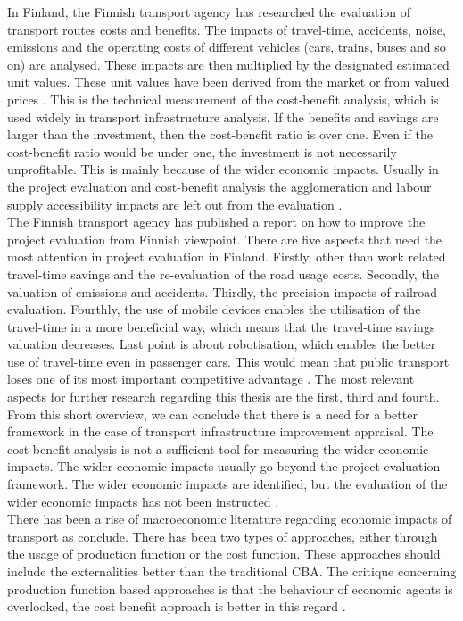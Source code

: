 In Finland, the Finnish transport agency has researched the evaluation of transport routes costs and benefits. The impacts of travel-time, accidents, noise, emissions and the operating costs of different vehicles (cars, trains, buses and so on) are analysed. These impacts are then multiplied by the designated estimated unit values. These unit values have been derived from the market or from valued prices \citep{liikenne}. This is the technical measurement of the cost-benefit analysis, which is used widely in transport infrastructure analysis. If the benefits and savings are larger than the investment, then the cost-benefit ratio is over one. Even if the cost-benefit ratio would be under one, the investment is not necessarily unprofitable. This is mainly because of the wider economic impacts. Usually in the project evaluation and cost-benefit analysis the agglomeration and labour supply accessibility impacts are left out from the evaluation \citep{goebel}. \\

The Finnish transport agency has published a report on how to improve the project evaluation from Finnish viewpoint. There are five aspects that need the most attention in project evaluation in Finland. Firstly, other than work related travel-time savings and the re-evaluation of the road usage costs. Secondly, the valuation of emissions and accidents. Thirdly, the precision impacts of railroad evaluation. Fourthly, the use of mobile devices enables the utilisation of the travel-time in a more beneficial way, which means that the travel-time savings valuation decreases. Last point is about robotisation, which enables the better use of travel-time even in passenger cars. This would mean that public transport loses one of its most important competitive advantage \citep{goebel}. The most relevant aspects for further research regarding this thesis are the first, third and fourth. \\

From this short overview, we can conclude that there is a need for a better framework in the case of transport infrastructure improvement appraisal. The cost-benefit analysis is not a sufficient tool for measuring the wider economic impacts. The wider economic impacts usually go beyond the project evaluation framework. The wider economic impacts are identified, but the evaluation of the wider economic impacts has not been instructed \citep{laakso}. \\

There has been a rise of macroeconomic literature regarding economic impacts of transport as \cite{andersson} conclude. There has been two types of approaches, either through the usage of production function or the cost function. These approaches should include the externalities better than the traditional CBA. The critique concerning production function based approaches is that the behaviour of economic agents is overlooked, the cost benefit approach is better in this regard \citep{andersson}. \\

